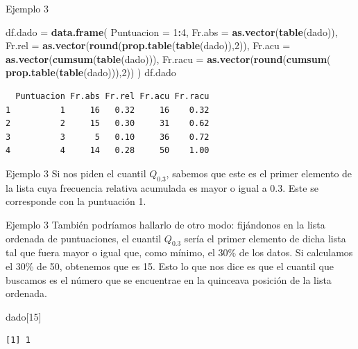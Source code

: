 \documentclass[
  ignorenonframetext,
  aspectratio=169]{beamer}
\newenvironment{Shaded}{\begin{snugshade}}{\end{snugshade}}
\newcommand{\AttributeTok}[1]{\textcolor[rgb]{0.13,0.29,0.53}{#1}}
\newcommand{\DecValTok}[1]{\textcolor[rgb]{0.00,0.00,0.81}{#1}}
\newcommand{\FunctionTok}[1]{\textcolor[rgb]{0.13,0.29,0.53}{\textbf{#1}}}
\newcommand{\NormalTok}[1]{#1}
\newcommand{\OtherTok}[1]{\textcolor[rgb]{0.56,0.35,0.01}{#1}}
\newcommand{\SpecialCharTok}[1]{\textcolor[rgb]{0.81,0.36,0.00}{\textbf{#1}}}
\begin{document}
\begin{frame}[fragile]{Ejemplo 3}
\label{ejemplo-3-6}
\begin{Shaded}
\begin{Highlighting}[]
\NormalTok{df.dado }\OtherTok{=} \FunctionTok{data.frame}\NormalTok{(}
  \AttributeTok{Puntuacion =} \DecValTok{1}\SpecialCharTok{:}\DecValTok{4}\NormalTok{,}
  \AttributeTok{Fr.abs =} \FunctionTok{as.vector}\NormalTok{(}\FunctionTok{table}\NormalTok{(dado)),}
  \AttributeTok{Fr.rel =} \FunctionTok{as.vector}\NormalTok{(}\FunctionTok{round}\NormalTok{(}\FunctionTok{prop.table}\NormalTok{(}\FunctionTok{table}\NormalTok{(dado)),}\DecValTok{2}\NormalTok{)),}
  \AttributeTok{Fr.acu =} \FunctionTok{as.vector}\NormalTok{(}\FunctionTok{cumsum}\NormalTok{(}\FunctionTok{table}\NormalTok{(dado))),}
  \AttributeTok{Fr.racu =} \FunctionTok{as.vector}\NormalTok{(}\FunctionTok{round}\NormalTok{(}\FunctionTok{cumsum}\NormalTok{(}
    \FunctionTok{prop.table}\NormalTok{(}\FunctionTok{table}\NormalTok{(dado))),}\DecValTok{2}\NormalTok{))}
\NormalTok{  )}
\NormalTok{df.dado}
\end{Highlighting}
\end{Shaded}

\begin{verbatim}
  Puntuacion Fr.abs Fr.rel Fr.acu Fr.racu
1          1     16   0.32     16    0.32
2          2     15   0.30     31    0.62
3          3      5   0.10     36    0.72
4          4     14   0.28     50    1.00
\end{verbatim}
\end{frame}

\begin{frame}{Ejemplo 3}
\label{ejemplo-3-7}
Si nos piden el cuantil \(Q_{0.3}\), sabemos que este es el primer
elemento de la lista cuya frecuencia relativa acumulada es mayor o igual
a 0.3. Este se corresponde con la puntuación 1.
\end{frame}

\begin{frame}[fragile]{Ejemplo 3}
\label{ejemplo-3-8}
También podríamos hallarlo de otro modo: fijándonos en la lista ordenada
de puntuaciones, el cuantil \(Q_{0.3}\) sería el primer elemento de
dicha lista tal que fuera mayor o igual que, como mínimo, el 30\% de los
datos. Si calculamos el 30\% de 50, obtenemos que es 15. Esto lo que nos
dice es que el cuantil que buscamos es el número que se encuentrae en la
quinceava posición de la lista ordenada.

\begin{Shaded}
\begin{Highlighting}[]
\NormalTok{dado[}\DecValTok{15}\NormalTok{]}
\end{Highlighting}
\end{Shaded}

\begin{verbatim}
[1] 1
\end{verbatim}
\end{frame}
\end{document}
